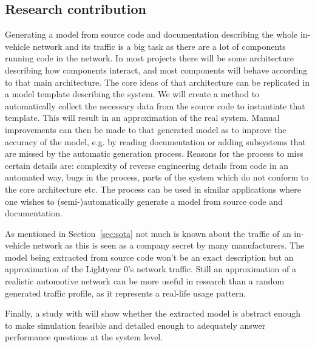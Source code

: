 \subsection{Research contribution}
\label{sec:research_contribution}
Generating a model from source code and documentation describing the whole in-vehicle network and its traffic is a big task as there are a lot of components running code in the network. In most projects there will be some architecture describing how components interact, and most components will behave according to that main architecture. The core ideas of that architecture can be replicated in a model template describing the system. We will create a method to automatically collect the necessary data from the source code to instantiate that template. This will result in an approximation of the real system. Manual improvements can then be made to that generated model as to improve the accuracy of the model, e.g. by reading documentation or adding subsystems that are missed by the automatic generation process. Reasons for the process to miss certain details are: complexity of reverse engineering details from code in an automated way, bugs in the process, parts of the system which do not conform to the core architecture etc. The process can be used in similar applications where one wishes to (semi-)automatically generate a model from source code and documentation.

As mentioned in Section~\ref{sec:sota} not much is known about the traffic of an in-vehicle network as this is seen as a company secret by many manufacturers. The model being extracted from source code won't be an exact description but an approximation of the Lightyear 0's network traffic. Still an approximation of a realistic automotive network can be more useful in research than a random generated traffic profile, as it represents a real-life usage pattern. 

Finally, a study with \omnet will show whether the extracted model is abstract enough to make simulation feasible and detailed enough to adequately answer performance questions at the system level.
